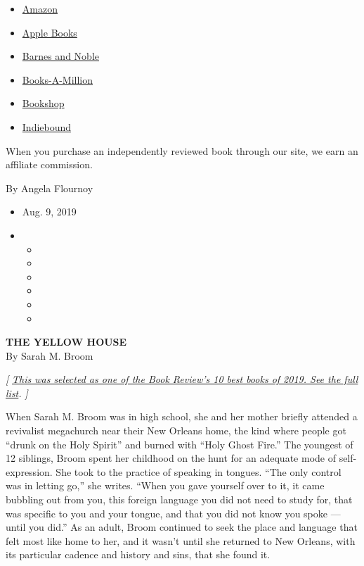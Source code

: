 \begin{itemize}
\tightlist
\item
  \href{https://www.amazon.com/gp/search?index=books\&tag=NYTBSREV-20\&field-keywords=The+Yellow+House+Sarah+M.+Broom}{Amazon}
\item
  \href{https://du-gae-books-dot-nyt-du-prd.appspot.com/buy?title=The+Yellow+House\&author=Sarah+M.+Broom}{Apple
  Books}
\item
  \href{https://www.anrdoezrs.net/click-7990613-11819508?url=https\%3A\%2F\%2Fwww.barnesandnoble.com\%2Fw\%2F\%3Fean\%3D9780802125088}{Barnes
  and Noble}
\item
  \href{https://www.anrdoezrs.net/click-7990613-35140?url=https\%3A\%2F\%2Fwww.booksamillion.com\%2Fp\%2FThe\%2BYellow\%2BHouse\%2FSarah\%2BM.\%2BBroom\%2F9780802125088}{Books-A-Million}
\item
  \href{https://bookshop.org/a/3546/9780802125088}{Bookshop}
\item
  \href{https://www.indiebound.org/book/9780802125088?aff=NYT}{Indiebound}
\end{itemize}

When you purchase an independently reviewed book through our site, we
earn an affiliate commission.

By Angela Flournoy

\begin{itemize}
\item
  Aug. 9, 2019
\item
  \begin{itemize}
  \item
  \item
  \item
  \item
  \item
  \item
  \end{itemize}
\end{itemize}

\textbf{\textbf{THE YELLOW HOUSE}}\\
By Sarah M. Broom

\emph{{[}}
\href{https://www.nytimes3xbfgragh.onion/2019/11/22/books/review/best-books.html}{\emph{This
was selected as one of the Book Review's 10 best books of 2019. See the
full list}}\emph{. {]}}

When Sarah M. Broom was in high school, she and her mother briefly
attended a revivalist megachurch near their New Orleans home, the kind
where people got ``drunk on the Holy Spirit'' and burned with ``Holy
Ghost Fire.'' The youngest of 12 siblings, Broom spent her childhood on
the hunt for an adequate mode of self-expression. She took to the
practice of speaking in tongues. ``The only control was in letting go,''
she writes. ``When you gave yourself over to it, it came bubbling out
from you, this foreign language you did not need to study for, that was
specific to you and your tongue, and that you did not know you spoke ---
until you did.'' As an adult, Broom continued to seek the place and
language that felt most like home to her, and it wasn't until she
returned to New Orleans, with its particular cadence and history and
sins, that she found it.


